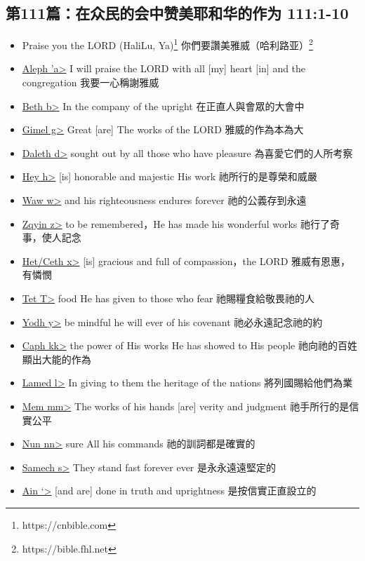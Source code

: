 \subsection{第111篇：在众民的会中赞美耶和华的作为 111:1-10}
\begin{itemize}
\itemsep-.45em  
\item Praise you the LORD (HaliLu, Ya)\footnote{https://cnbible.com} 你們要讚美雅威（哈利路亚）\footnote{https://bible.fhl.net} 
\item \underline{Aleph \<'a>} I will praise the LORD with all [my] heart [in] and the congregation 我要一心稱謝雅威 
\item \underline{Beth \<b>} In the company of the upright 在正直人與會眾的大會中 
\item \underline{Gimel \<g>} Great [are] The works of the LORD 雅威的作為本為大   
\item \underline{Daleth \<d>} sought out by all those who have pleasure 為喜愛它們的人所考察 
\item \underline{Hey \<h>} [is] honorable and majestic His work 祂所行的是尊榮和威嚴 
\item \underline{Waw \<w>} and his righteousness endures forever 祂的公義存到永遠 \\
\item \underline{Zqyin  \<z>} to be remembered，He has made his wonderful works 祂行了奇事，使人記念 
\item \underline{Het/Ceth  \<x>} [is] gracious and full of compassion，the LORD 雅威有恩惠，有憐憫 
\item \underline{Tet  \<T>} food He has given to those who fear 祂賜糧食給敬畏祂的人 
\item \underline{Yodh \<y>} be mindful he will ever of his covenant 祂必永遠記念祂的約 
\item \underline{Caph \<kk>} the power of His works He has showed to His people 祂向祂的百姓顯出大能的作為 
\item \underline{Lamed \<l>} In giving to them the heritage of the nations 將列國賜給他們為業 
\item \underline{Mem \<mm>} The works of his hands [are] verity and judgment 祂手所行的是信實公平 
\item \underline{Nun \<nn>} sure All his commands 祂的訓詞都是確實的\\
\item \underline{Samech \<s>} They stand fast forever ever 是永永遠遠堅定的\\
\item \underline{Ain \<`>} [and are] done in truth and uprightness 是按信實正直設立的 

\end{itemize}
